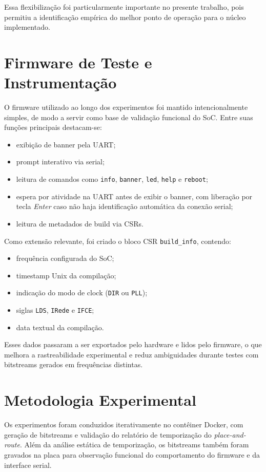 \documentclass[10pt,twocolumn,a4paper]{article}
\begin{document}
Essa flexibiliza\c{c}\~ao foi particularmente importante no presente trabalho, pois permitiu a identifica\c{c}\~ao emp\'irica do melhor ponto de opera\c{c}\~ao para o n\'ucleo implementado.

\section{Firmware de Teste e Instrumenta\c{c}\~ao}
O firmware utilizado ao longo dos experimentos foi mantido intencionalmente simples, de modo a servir como base de valida\c{c}\~ao funcional do SoC. Entre suas fun\c{c}\~oes principais destacam-se:
\begin{itemize}[leftmargin=*]
    \item exibi\c{c}\~ao de banner pela UART;
    \item prompt interativo via serial;
    \item leitura de comandos como \texttt{info}, \texttt{banner}, \texttt{led}, \texttt{help} e \texttt{reboot};
    \item espera por atividade na UART antes de exibir o banner, com libera\c{c}\~ao por tecla \textit{Enter} caso n\~ao haja identifica\c{c}\~ao autom\'atica da conex\~ao serial;
    \item leitura de metadados de build via CSRs.
\end{itemize}

Como extens\~ao relevante, foi criado o bloco CSR \texttt{build\_info}, contendo:
\begin{itemize}[leftmargin=*]
    \item frequ\^encia configurada do SoC;
    \item timestamp Unix da compila\c{c}\~ao;
    \item indica\c{c}\~ao do modo de clock (\texttt{DIR} ou \texttt{PLL});
    \item siglas \texttt{LDS}, \texttt{IRede} e \texttt{IFCE};
    \item data textual da compila\c{c}\~ao.
\end{itemize}

Esses dados passaram a ser exportados pelo hardware e lidos pelo firmware, o que melhora a rastreabilidade experimental e reduz ambiguidades durante testes com bitstreams gerados em frequ\^encias distintas.

\section{Metodologia Experimental}
Os experimentos foram conduzidos iterativamente no cont\^einer Docker, com gera\c{c}\~ao de bitstreams e valida\c{c}\~ao do relat\'orio de temporiza\c{c}\~ao do \textit{place-and-route}. Al\'em da an\'alise est\'atica de temporiza\c{c}\~ao, os bitstreams tamb\'em foram gravados na placa para observa\c{c}\~ao funcional do comportamento do firmware e da interface serial.
\end{document}
